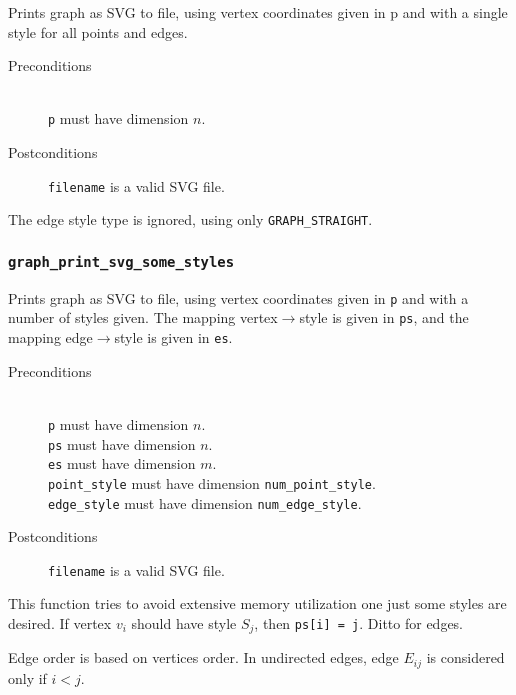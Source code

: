 Prints graph as SVG to file, using vertex coordinates given in p and with a 
single style for all points and edges.

\begin{description}
 \item[Preconditions]~\\
   \texttt{p} must have dimension $n$.
 \item[Postconditions]
   \texttt{filename} is a valid SVG file.
\end{description}

The edge style type is ignored, using only \texttt{GRAPH\_STRAIGHT}.

\subsubsection{\texttt{graph\_print\_svg\_some\_styles}}

Prints graph as SVG to file, using vertex coordinates given in \texttt{p} and
with a number of styles given. The mapping vertex$\to$style is given in \texttt{ps},
and the mapping edge$\to$style is given in \texttt{es}.

\begin{description}
 \item[Preconditions]~\\
   \texttt{p} must have dimension $n$.\\
   \texttt{ps} must have dimension $n$.\\
   \texttt{es} must have dimension $m$.\\
   \texttt{point\_style} must have dimension \texttt{num\_point\_style}.\\
   \texttt{edge\_style} must have dimension \texttt{num\_edge\_style}.
 \item[Postconditions]
   \texttt{filename} is a valid SVG file.
\end{description}

This function tries to avoid extensive memory utilization one just some 
styles are desired. If vertex $v_i$ should have style $S_j$, then 
\texttt{ps[i] = j}. Ditto for edges.

Edge order is based on vertices order. In undirected edges, edge $E_{ij}$ 
is considered only if $i < j$.
